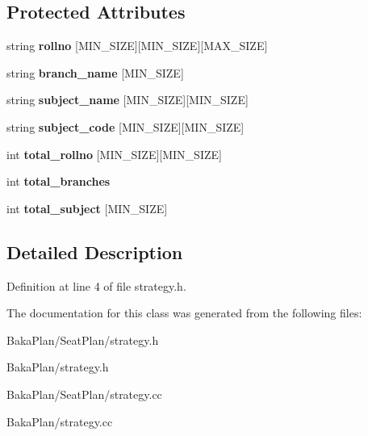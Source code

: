 \subsection*{Protected Attributes}
\begin{DoxyCompactItemize}
\item 
\hypertarget{classStrategy_a4b6305b8d54a2221f880d2e7bab495e1}{string {\bfseries rollno} \mbox{[}M\-I\-N\-\_\-\-S\-I\-Z\-E\mbox{]}\mbox{[}M\-I\-N\-\_\-\-S\-I\-Z\-E\mbox{]}\mbox{[}M\-A\-X\-\_\-\-S\-I\-Z\-E\mbox{]}}\label{classStrategy_a4b6305b8d54a2221f880d2e7bab495e1}

\item 
\hypertarget{classStrategy_a0b6fc37cf32cc73336f6560c7edb6e0c}{string {\bfseries branch\-\_\-name} \mbox{[}M\-I\-N\-\_\-\-S\-I\-Z\-E\mbox{]}}\label{classStrategy_a0b6fc37cf32cc73336f6560c7edb6e0c}

\item 
\hypertarget{classStrategy_ab7afc1d54ea614a242a3f46ed996ead1}{string {\bfseries subject\-\_\-name} \mbox{[}M\-I\-N\-\_\-\-S\-I\-Z\-E\mbox{]}\mbox{[}M\-I\-N\-\_\-\-S\-I\-Z\-E\mbox{]}}\label{classStrategy_ab7afc1d54ea614a242a3f46ed996ead1}

\item 
\hypertarget{classStrategy_ae83fbca3ce4074e6ce9635370cdadafa}{string {\bfseries subject\-\_\-code} \mbox{[}M\-I\-N\-\_\-\-S\-I\-Z\-E\mbox{]}\mbox{[}M\-I\-N\-\_\-\-S\-I\-Z\-E\mbox{]}}\label{classStrategy_ae83fbca3ce4074e6ce9635370cdadafa}

\item 
\hypertarget{classStrategy_ad3f61d0dbda67dc3edb9787c2faaeaed}{int {\bfseries total\-\_\-rollno} \mbox{[}M\-I\-N\-\_\-\-S\-I\-Z\-E\mbox{]}\mbox{[}M\-I\-N\-\_\-\-S\-I\-Z\-E\mbox{]}}\label{classStrategy_ad3f61d0dbda67dc3edb9787c2faaeaed}

\item 
\hypertarget{classStrategy_a256aac5a8349dd1bafdb6c14d3e9543f}{int {\bfseries total\-\_\-branches}}\label{classStrategy_a256aac5a8349dd1bafdb6c14d3e9543f}

\item 
\hypertarget{classStrategy_ab4c32858e3c2bb708a299643e128632a}{int {\bfseries total\-\_\-subject} \mbox{[}M\-I\-N\-\_\-\-S\-I\-Z\-E\mbox{]}}\label{classStrategy_ab4c32858e3c2bb708a299643e128632a}

\end{DoxyCompactItemize}


\subsection{Detailed Description}


Definition at line 4 of file strategy.\-h.



The documentation for this class was generated from the following files\-:\begin{DoxyCompactItemize}
\item 
Baka\-Plan/\-Seat\-Plan/strategy.\-h\item 
Baka\-Plan/strategy.\-h\item 
Baka\-Plan/\-Seat\-Plan/strategy.\-cc\item 
Baka\-Plan/strategy.\-cc\end{DoxyCompactItemize}
